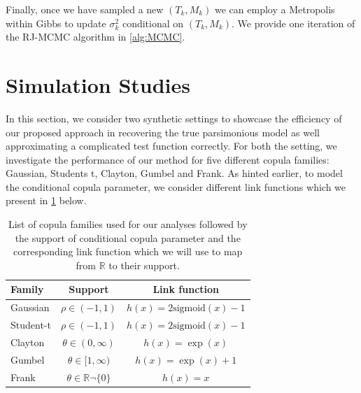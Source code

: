 \documentclass{amsart}
\begin{document}
Finally, once we have sampled a new $(T_k,M_k)$ we can employ a Metropolis within Gibbs to update $\sigma_{k}^2$ conditional on $(T_k,M_k)$. We provide one iteration of the RJ-MCMC algorithm in \cref{alg:MCMC}.


\section{Simulation Studies}\label{sec:sim}

In this section, we consider two synthetic settings to showcase the efficiency of our proposed approach in recovering the true parsimonious model as well approximating a complicated test function correctly. For both the setting, we investigate the performance of our method for five different copula families: Gaussian, Students t, Clayton, Gumbel and Frank. As hinted earlier, to model the conditional copula parameter, we consider different link functions which we present in \cref{tab:cop:link} below.

\begin{table}[H]
	\centering
	\begin{tabular}{l|c|c}
		Family & Support & Link function\\
		\midrule
		Gaussian & $\rho \in (-1,1)$ & $h(x)=2\text{sigmoid}(x) -1$\\
		Student-t & $\rho \in (-1,1)$ & $h(x)=2\text{sigmoid}(x) -1$\\
		Clayton & $\theta \in (0,\infty)$ & $h(x)=\exp(x)$\\
		Gumbel & $\theta\in [1,\infty)$ & $h(x)=\exp(x)+1$\\
		Frank & $\theta\in \mathbb{R}\neg \{0\}$ & $h(x)=x$\\
		\end{tabular}
	\caption{List of copula families used for our analyses followed by the support of conditional copula parameter and the corresponding link function which we will use to map from $\mathbb{R}$ to their support.}
	\label{tab:cop:link}
\end{table}
\end{document}
